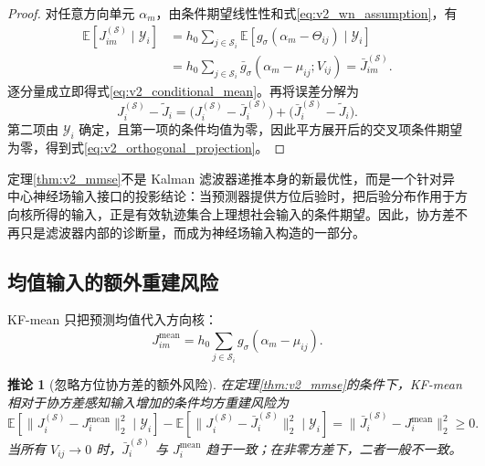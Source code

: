 \documentclass[UTF8,fontset=windows,11pt]{ctexart}
\newtheorem{corollary}[theorem]{推论}
\newcommand{\E}{\mathbb E}
\begin{document}
\begin{proof}
对任意方向单元 $\alpha_m$，由条件期望线性性和式\eqref{eq:v2_wn_assumption}，有
\begin{equation}
 \begin{aligned}
 \E[J_{im}^{(\mathcal S)}\mid\mathcal Y_i]
 &=h_0\sum_{j\in\mathcal S_i}
 \E[g_\sigma(\alpha_m-\Theta_{ij})\mid\mathcal Y_i]\\
 &=h_0\sum_{j\in\mathcal S_i}
 \bar g_\sigma(\alpha_m-\mu_{ij};V_{ij})
 =\bar J_{im}^{(\mathcal S)}.
 \end{aligned}
 \label{eq:v2_component_expectation}
\end{equation}
逐分量成立即得式\eqref{eq:v2_conditional_mean}。再将误差分解为
\begin{equation}
 J_i^{(\mathcal S)}-\widetilde J_i
 =\bigl(J_i^{(\mathcal S)}-\bar J_i^{(\mathcal S)}\bigr)
 +\bigl(\bar J_i^{(\mathcal S)}-\widetilde J_i\bigr).
 \label{eq:v2_error_decomposition}
\end{equation}
第二项由 $\mathcal Y_i$ 确定，且第一项的条件均值为零，因此平方展开后的交叉项条件期望为零，得到式\eqref{eq:v2_orthogonal_projection}。
\end{proof}

定理\ref{thm:v2_mmse}不是 Kalman 滤波器递推本身的新最优性，而是一个针对异中心神经场输入接口的投影结论：当预测器提供方位后验时，把后验分布作用于方向核所得的输入，正是有效轨迹集合上理想社会输入的条件期望。因此，协方差不再只是滤波器内部的诊断量，而成为神经场输入构造的一部分。

\subsection{均值输入的额外重建风险}

KF-mean 只把预测均值代入方向核：
\begin{equation}
 J_{im}^{\mathrm{mean}}=h_0\sum_{j\in\mathcal S_i}
 g_\sigma(\alpha_m-\mu_{ij}).
 \label{eq:v2_mean_input}
\end{equation}

\begin{corollary}[忽略方位协方差的额外风险]
\label{cor:v2_mean_risk}
在定理\ref{thm:v2_mmse}的条件下，KF-mean 相对于协方差感知输入增加的条件均方重建风险为
\begin{equation}
 \E[\|J_i^{(\mathcal S)}-J_i^{\mathrm{mean}}\|_2^2\mid\mathcal Y_i]
 -\E[\|J_i^{(\mathcal S)}-\bar J_i^{(\mathcal S)}\|_2^2\mid\mathcal Y_i]
 =\|\bar J_i^{(\mathcal S)}-J_i^{\mathrm{mean}}\|_2^2\ge0.
 \label{eq:v2_mean_risk_gap}
\end{equation}
当所有 $V_{ij}\to0$ 时，$\bar J_i^{(\mathcal S)}$ 与 $J_i^{\mathrm{mean}}$ 趋于一致；在非零方差下，二者一般不一致。
\end{corollary}
\end{document}
